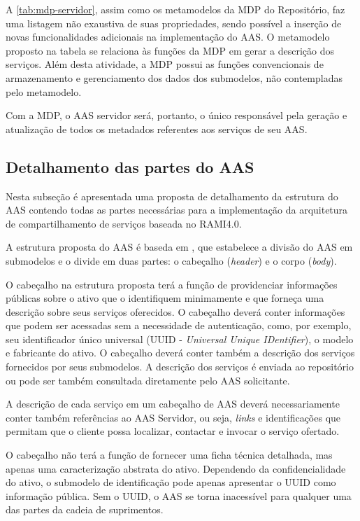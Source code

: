 	A \autoref{tab:mdp-servidor}, assim como os metamodelos da MDP do Repositório, faz uma listagem não exaustiva de suas propriedades, sendo possível a inserção de novas funcionalidades adicionais na implementação do AAS. O metamodelo proposto na tabela se relaciona às funções da MDP em gerar a descrição dos serviços. Além desta atividade, a MDP possui as funções convencionais de armazenamento e gerenciamento dos dados dos submodelos, não contempladas pelo metamodelo. 
	
	Com a MDP, o AAS servidor será, portanto, o único responsável pela geração e atualização de todos os metadados referentes aos serviços de seu AAS.

	
\subsection{ Detalhamento das partes do AAS }

	Nesta subseção é apresentada uma proposta de detalhamento da estrutura do AAS contendo todas as partes necessárias para a implementação da arquitetura de compartilhamento de serviços baseada no RAMI4.0. 
	
	A estrutura proposta do AAS é baseda em , que estabelece a divisão do AAS em submodelos e o divide em duas partes: o cabeçalho (\textit{header}) e o corpo (\textit{body}).
	
	O cabeçalho na estrutura proposta terá a função de providenciar informações públicas sobre o ativo que o identifiquem minimamente e que forneça uma descrição sobre seus serviços oferecidos. O cabeçalho deverá conter informações que podem ser acessadas sem a necessidade de autenticação, como, por exemplo, seu identificador único universal (UUID - \textit{Universal Unique IDentifier}), o modelo e fabricante do ativo. O cabeçalho deverá conter também a descrição dos serviços fornecidos por seus submodelos. A descrição dos serviços é enviada ao repositório ou pode ser também consultada diretamente pelo AAS solicitante.
	
	A descrição de cada serviço em um cabeçalho de AAS deverá necessariamente conter também referências ao AAS Servidor, ou seja, \textit{links} e identificações que permitam que o cliente possa localizar, contactar e invocar o serviço ofertado.
	
	O cabeçalho não terá a função de fornecer uma ficha técnica detalhada, mas apenas uma caracterização abstrata do ativo. Dependendo da confidencialidade do ativo, o submodelo de identificação pode apenas apresentar o UUID como informação pública. Sem o UUID, o AAS se torna inacessível para qualquer uma das partes da cadeia de suprimentos.
	
